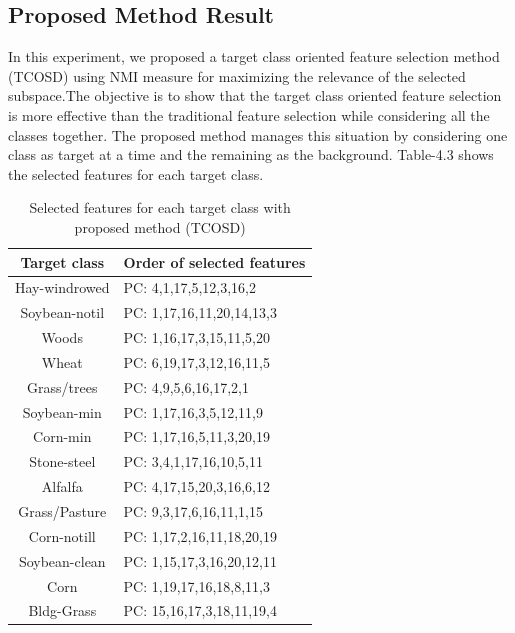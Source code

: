 \documentclass[document.tex]{subfiles}
\begin{document}
\subsection{Proposed Method Result}
In this experiment, we proposed a target class oriented feature selection method (TCOSD) using NMI measure for maximizing the relevance of the selected subspace.The objective is to show that the target class oriented feature selection is more effective than the traditional feature selection while considering all the classes together. The proposed method manages this situation by considering one class as target at a time and the remaining as the background. Table-4.3 shows the selected features for each target class. 
\begin{table}[H]
	\caption{Selected features for each target class with proposed method (TCOSD)}
	\begin{center}
		\begin{tabular}{|c|l|}
			\hline
			Target class & Order of selected features\\ \hline
			Hay-windrowed & PC: 4,1,17,5,12,3,16,2\\ \hline
			Soybean-notil & PC: 1,17,16,11,20,14,13,3\\ \hline
			Woods & PC: 1,16,17,3,15,11,5,20\\ \hline
			Wheat & PC: 6,19,17,3,12,16,11,5\\ \hline
			Grass/trees & PC: 4,9,5,6,16,17,2,1\\ \hline
			Soybean-min & PC: 1,17,16,3,5,12,11,9\\ \hline
			Corn-min & PC: 1,17,16,5,11,3,20,19\\ \hline
			Stone-steel & PC: 3,4,1,17,16,10,5,11\\ \hline
			Alfalfa & PC: 4,17,15,20,3,16,6,12\\ \hline
			Grass/Pasture & PC: 9,3,17,6,16,11,1,15\\ \hline
			Corn-notill & PC: 1,17,2,16,11,18,20,19\\ \hline
			Soybean-clean & PC: 1,15,17,3,16,20,12,11\\ \hline
			Corn & PC: 1,19,17,16,18,8,11,3\\ \hline
			Bldg-Grass & PC: 15,16,17,3,18,11,19,4\\ \hline
		\end{tabular}
	\end{center}
	\label{tab:Selected features for each target class with proposed method (TCOSD)}
\end{table}
\end{document}
